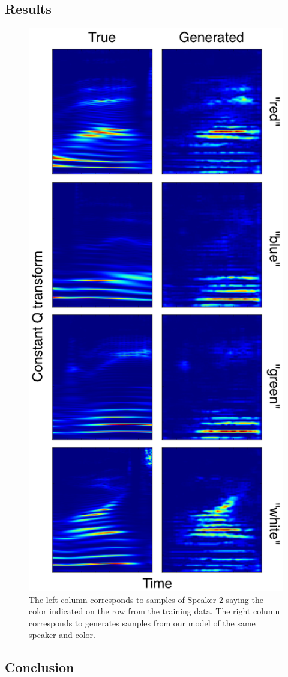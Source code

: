 \documentclass{article}
\begin{document}
\subsection{Results}

\begin{figure}[h]
    \centering
    \includegraphics[scale=0.40]{results.png}
    \caption{The left column corresponds to samples of Speaker 2 saying the color indicated on the row from the training data. The right column corresponds to generates samples from our model of the same speaker and color.}
    \label{results}
\end{figure}


\subsection{Conclusion}

{\small
\clearpage

}
\end{document}
